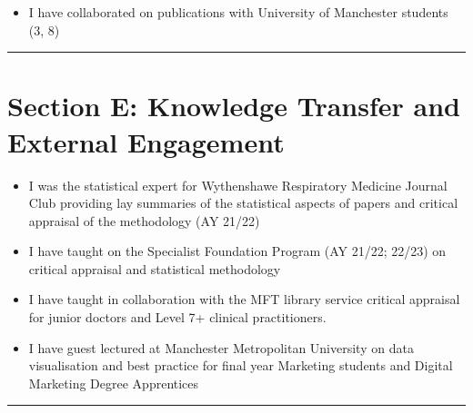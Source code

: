 \documentclass[
]{article}
\providecommand{\tightlist}{%
  \setlength{\itemsep}{0pt}\setlength{\parskip}{0pt}}
\begin{document}
\begin{itemize}
\tightlist
\item
  I have collaborated on publications with University of Manchester
  students (3, 8)
\end{itemize}

\begin{center}\rule{0.5\linewidth}{0.5pt}\end{center}

\hypertarget{section-e-knowledge-transfer-and-external-engagement}{%
\section{Section E: Knowledge Transfer and External
Engagement}\label{section-e-knowledge-transfer-and-external-engagement}}

\begin{itemize}
\tightlist
\item
  I was the statistical expert for Wythenshawe Respiratory Medicine
  Journal Club providing lay summaries of the statistical aspects of
  papers and critical appraisal of the methodology (AY 21/22)
\item
  I have taught on the Specialist Foundation Program (AY 21/22; 22/23)
  on critical appraisal and statistical methodology
\item
  I have taught in collaboration with the MFT library service critical
  appraisal for junior doctors and Level 7+ clinical practitioners.
\item
  I have guest lectured at Manchester Metropolitan University on data
  visualisation and best practice for final year Marketing students and
  Digital Marketing Degree Apprentices
\end{itemize}

\begin{center}\rule{0.5\linewidth}{0.5pt}\end{center}
\end{document}
